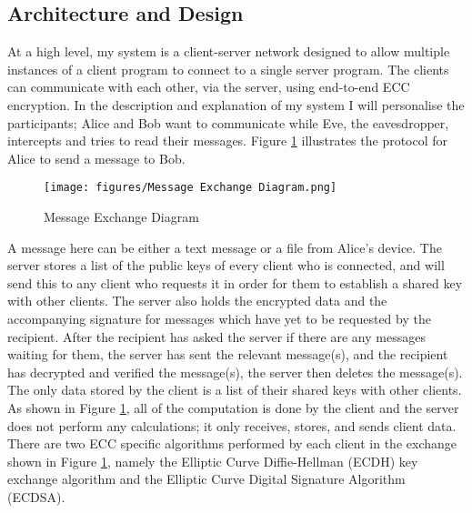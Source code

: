 \documentclass[12pt,a4paper]{article}
\begin{document}
\subsection{Architecture and Design} \noindent \label{Architecture}
At a high level, my system is a client-server network designed to allow 
multiple instances of a client program to connect to a single server program. 
The clients can communicate with each other, via the server, using end-to-end ECC encryption. 
In the description and explanation of my system I will personalise the participants; 
Alice and Bob want to communicate while Eve, the eavesdropper, intercepts and tries to read their messages. 
Figure \ref{fig:messages} illustrates the protocol for Alice to send a message to Bob. 

\begin{figure}[!htb]
    \centering
    \texttt{[image: figures/Message Exchange Diagram.png]}
    \caption{Message Exchange Diagram}
    \label{fig:messages}
\end{figure}

A message here can be either a text message or a file from Alice's device. 
The server stores a list of the public keys of every client who is connected, 
and will send this to any client who requests it in order for them to establish a shared key with other clients. 
The server also holds the encrypted data and the accompanying signature for messages which have yet to be requested by the recipient. 
After the recipient has asked the server if there are any messages waiting for them, the server has sent the relevant message(s), 
and the recipient has decrypted and verified the message(s), the server then deletes the message(s). 
The only data stored by the client is a list of their shared keys with other clients. 
As shown in Figure \ref{fig:messages}, all of the computation is done by the client and the server does not perform any calculations; 
it only receives, stores, and sends client data. 
There are two ECC specific algorithms performed by each client in the exchange shown in Figure \ref{fig:messages}, 
namely the Elliptic Curve Diffie-Hellman (ECDH) key exchange algorithm and the Elliptic Curve Digital Signature Algorithm (ECDSA). 
\end{document}
